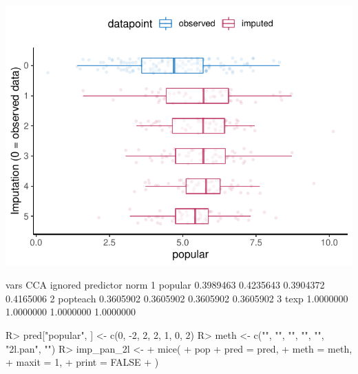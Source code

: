 \documentclass[
]{jss}
\begin{document}
\begin{CodeChunk}


\begin{center}\includegraphics{Manuscript_files/figure-latex/pop_norm_eval-1} \end{center}

\begin{CodeOutput}
      vars       CCA   ignored predictor      norm
1  popular 0.3989463 0.4235643 0.3904372 0.4165006
2 popteach 0.3605902 0.3605902 0.3605902 0.3605902
3     texp 1.0000000 1.0000000 1.0000000 1.0000000
\end{CodeOutput}
\end{CodeChunk}

\begin{CodeChunk}
\begin{CodeInput}
R> pred["popular", ] <- c(0, -2, 2, 2, 1, 0, 2)
R> meth <- c("", "", "", "", "", "2l.pan", "")
R> imp_pan_2l <-
+   mice(
+     pop %
+     pred = pred,
+     meth = meth,
+     maxit = 1,
+     print = FALSE
+   )
\end{CodeInput}
\end{CodeChunk}
\end{document}
